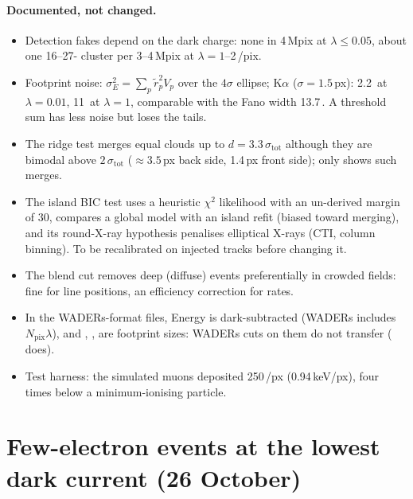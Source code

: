 \paragraph{Documented, not changed.}
\begin{itemize}
\item Detection fakes depend on the dark charge: none in 4\,Mpix at $\lambda\le0.05$, about one 16--27-\el{} cluster
per 3--4\,Mpix at $\lambda=1$--2\,\el/pix.
\item Footprint noise: $\sigma_E^2=\sum_p\tilde r_p^2V_p$ over the $4\sigma$ ellipse; K$\alpha$ ($\sigma=1.5$\,px): 2.2\,\el{}
at $\lambda=0.01$, 11\,\el{} at $\lambda=1$, comparable with the Fano width 13.7\,\el. A threshold sum has less noise
but loses the tails.
\item The ridge test merges equal clouds up to $d=3.3\,\sigma_\mathrm{tot}$ although they are bimodal above
$2\,\sigma_\mathrm{tot}$ ($\approx3.5$\,px back side, 1.4\,px front side); only  shows such merges.
\item The island BIC test uses a heuristic $\chi^2$ likelihood with an un-derived margin of 30, compares a global model
with an island refit (biased toward merging), and its round-X-ray hypothesis penalises elliptical X-rays (CTI, column
binning). To be recalibrated on injected tracks before changing it.
\item The blend cut removes deep (diffuse) events preferentially in crowded fields: fine for line positions, an
efficiency correction for rates.
\item In the WADERs-format files, \AGMX{} Energy is dark-subtracted (WADERs includes $N_\mathrm{pix}\lambda$), and
, ,  are footprint sizes: WADERs cuts on them do not transfer ( does).
\item Test harness: the simulated muons deposited 250\,\el/px (0.94\,keV/px), four times below a minimum-ionising
particle.
\end{itemize}

\section{Few-electron events at the lowest dark current (26 October)}\label{sec:lowdark}


